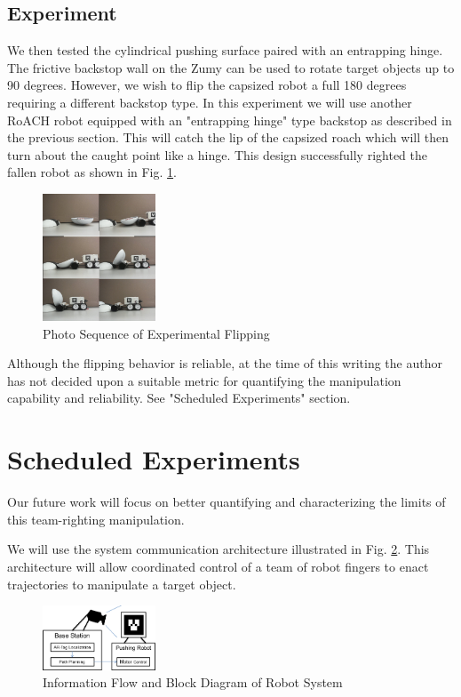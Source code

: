 \documentclass[runningheads,a4paper]{llncs}
\begin{document}
\subsection{Experiment}
We then tested the cylindrical pushing surface paired with an entrapping hinge.
The frictive backstop wall on the Zumy can be used to rotate target objects up to 90 degrees.
However, we wish to flip the capsized robot a full 180 degrees requiring a different backstop type.
In this experiment we will use another RoACH robot equipped with an "entrapping hinge" type backstop as described in the previous section.
This will catch the lip of the capsized roach which will then turn about the caught point like a hinge.
This design successfully righted the fallen robot as shown in Fig. \ref{fig:photos}.

\begin{figure}[h!]
\centering
\includegraphics[width=0.3\textwidth]{Photo_Sequence.jpg}
\caption{\label{fig:photos}Photo Sequence of Experimental Flipping}
\end{figure}

Although the flipping behavior is reliable, at the time of this writing the author has not decided upon a suitable metric for quantifying the manipulation capability and reliability. See "Scheduled Experiments" section.

\clearpage
\section{Scheduled Experiments}
Our future work will focus on better quantifying and characterizing the limits of this team-righting manipulation.

We will use the system communication architecture illustrated in Fig. \ref{fig:system}.
This architecture will allow coordinated control of a team of robot fingers to enact trajectories to manipulate a target object.

\begin{figure}[h!]
\centering
\includegraphics[width=0.3\textwidth]{System_Block_Diagram.png}
\caption{\label{fig:system}Information Flow and Block Diagram of Robot System}
\end{figure}
\end{document}
